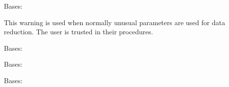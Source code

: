 \documentclass[letterpaper,10pt,english]{sphinxmanual}
\begin{document}

\begin{fulllineitems}
\label{\detokenize{python_docstrings/IfA_Smeargle.meta.errors:IfA_Smeargle.meta.errors.ReductionWarning}}
Bases: {\hyperref[\detokenize{python_docstrings/IfA_Smeargle.meta.errors:IfA_Smeargle.meta.errors.Smeargle_Warning}]{}}

This warning is used when normally unusual parameters are used for data
reduction. The user is trusted in their procedures.

\end{fulllineitems}


\begin{fulllineitems}
\label{\detokenize{python_docstrings/IfA_Smeargle.meta.errors:IfA_Smeargle.meta.errors.Smeargle_BaseException}}
Bases: 

\end{fulllineitems}


\begin{fulllineitems}
\label{\detokenize{python_docstrings/IfA_Smeargle.meta.errors:IfA_Smeargle.meta.errors.Smeargle_Exception}}
Bases: 

\end{fulllineitems}


\begin{fulllineitems}
\label{\detokenize{python_docstrings/IfA_Smeargle.meta.errors:IfA_Smeargle.meta.errors.Smeargle_Warning}}
Bases: 

\end{fulllineitems}
\end{document}
